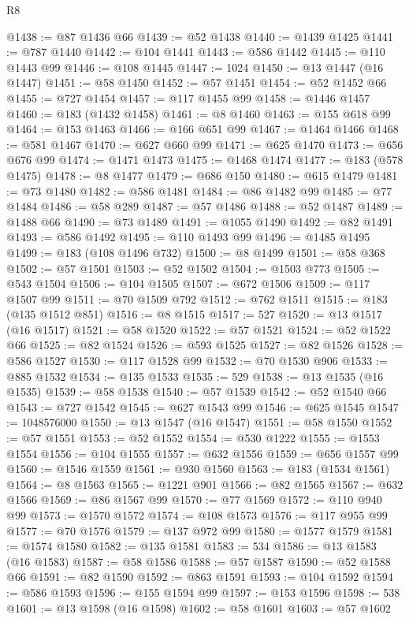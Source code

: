 \begin{lexlean}{R8}
\begin{coremodule}
@1438 := @87 @1436 @66
@1439 := @52 @1438
@1440 := @1439 @1425
@1441 := @787 @1440
@1442 := @104 @1441
@1443 := @586 @1442
@1445 := @110 @1443 @99
@1446 := @108 @1445
@1447 := 1024
@1450 := @13 @1447 (@16 @1447)
@1451 := @58 @1450
@1452 := @57 @1451
@1454 := @52 @1452 @66
@1455 := @727 @1454
@1457 := @117 @1455 @99
@1458 := @1446 @1457
@1460 := @183 (@1432 @1458)
@1461 := @8 @1460
@1463 := @155 @618 @99
@1464 := @153 @1463
@1466 := @166 @651 @99
@1467 := @1464 @1466
@1468 := @581 @1467
@1470 := @627 @660 @99
@1471 := @625 @1470
@1473 := @656 @676 @99
@1474 := @1471 @1473
@1475 := @1468 @1474
@1477 := @183 (@578 @1475)
@1478 := @8 @1477
@1479 := @686 @150
@1480 := @615 @1479
@1481 := @73 @1480
@1482 := @586 @1481
@1484 := @86 @1482 @99
@1485 := @77 @1484
@1486 := @58 @289
@1487 := @57 @1486
@1488 := @52 @1487
@1489 := @1488 @66
@1490 := @73 @1489
@1491 := @1055 @1490
@1492 := @82 @1491
@1493 := @586 @1492
@1495 := @110 @1493 @99
@1496 := @1485 @1495
@1499 := @183 (@108 @1496 @732)
@1500 := @8 @1499
@1501 := @58 @368
@1502 := @57 @1501
@1503 := @52 @1502
@1504 := @1503 @773
@1505 := @543 @1504
@1506 := @104 @1505
@1507 := @672 @1506
@1509 := @117 @1507 @99
@1511 := @70 @1509 @792
@1512 := @762 @1511
@1515 := @183 (@135 @1512 @851)
@1516 := @8 @1515
@1517 := 527
@1520 := @13 @1517 (@16 @1517)
@1521 := @58 @1520
@1522 := @57 @1521
@1524 := @52 @1522 @66
@1525 := @82 @1524
@1526 := @593 @1525
@1527 := @82 @1526
@1528 := @586 @1527
@1530 := @117 @1528 @99
@1532 := @70 @1530 @906
@1533 := @885 @1532
@1534 := @135 @1533
@1535 := 529
@1538 := @13 @1535 (@16 @1535)
@1539 := @58 @1538
@1540 := @57 @1539
@1542 := @52 @1540 @66
@1543 := @727 @1542
@1545 := @627 @1543 @99
@1546 := @625 @1545
@1547 := 1048576000
@1550 := @13 @1547 (@16 @1547)
@1551 := @58 @1550
@1552 := @57 @1551
@1553 := @52 @1552
@1554 := @530 @1222
@1555 := @1553 @1554
@1556 := @104 @1555
@1557 := @632 @1556
@1559 := @656 @1557 @99
@1560 := @1546 @1559
@1561 := @930 @1560
@1563 := @183 (@1534 @1561)
@1564 := @8 @1563
@1565 := @1221 @901
@1566 := @82 @1565
@1567 := @632 @1566
@1569 := @86 @1567 @99
@1570 := @77 @1569
@1572 := @110 @940 @99
@1573 := @1570 @1572
@1574 := @108 @1573
@1576 := @117 @955 @99
@1577 := @70 @1576
@1579 := @137 @972 @99
@1580 := @1577 @1579
@1581 := @1574 @1580
@1582 := @135 @1581
@1583 := 534
@1586 := @13 @1583 (@16 @1583)
@1587 := @58 @1586
@1588 := @57 @1587
@1590 := @52 @1588 @66
@1591 := @82 @1590
@1592 := @863 @1591
@1593 := @104 @1592
@1594 := @586 @1593
@1596 := @155 @1594 @99
@1597 := @153 @1596
@1598 := 538
@1601 := @13 @1598 (@16 @1598)
@1602 := @58 @1601
@1603 := @57 @1602

\end{coremodule}
\end{lexlean}
